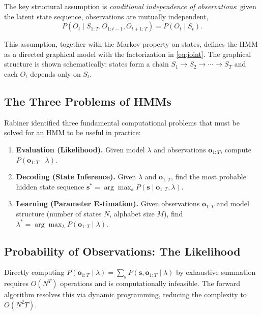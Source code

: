 \documentclass[conference]{IEEEtran}
\begin{document}
The key structural assumption is \emph{conditional independence of observations}: given the latent state sequence, observations are mutually independent,
\begin{equation}
P(O_t \mid S_{1:T}, O_{1:t-1}, O_{t+1:T}) = P(O_t \mid S_t).
\label{eq:obs_independence}
\end{equation}

This assumption, together with the Markov property on states, defines the HMM as a directed graphical model with the factorization in \eqref{eq:joint}. The graphical structure is shown schematically: states form a chain $S_1 \to S_2 \to \cdots \to S_T$ and each $O_t$ depends only on $S_t$.

\subsection{The Three Problems of HMMs}

Rabiner \cite{rabiner1989tutorial} identified three fundamental computational problems that must be solved for an HMM to be useful in practice:

\begin{enumerate}
  \item \textbf{Evaluation (Likelihood).} Given model $\lambda$ and observations $\mathbf{o}_{1:T}$, compute $P(\mathbf{o}_{1:T} \mid \lambda)$.
  \item \textbf{Decoding (State Inference).} Given $\lambda$ and $\mathbf{o}_{1:T}$, find the most probable hidden state sequence $\mathbf{s}^* = \arg\max_{\mathbf{s}} P(\mathbf{s} \mid \mathbf{o}_{1:T}, \lambda)$.
  \item \textbf{Learning (Parameter Estimation).} Given observations $\mathbf{o}_{1:T}$ and model structure (number of states $N$, alphabet size $M$), find $\lambda^* = \arg\max_{\lambda} P(\mathbf{o}_{1:T} \mid \lambda)$.
\end{enumerate}

\subsection{Probability of Observations: The Likelihood}

Directly computing $P(\mathbf{o}_{1:T} \mid \lambda) = \sum_{\mathbf{s}} P(\mathbf{s}, \mathbf{o}_{1:T} \mid \lambda)$ by exhaustive summation requires $O(N^T)$ operations and is computationally infeasible. The forward algorithm resolves this via dynamic programming, reducing the complexity to $O(N^2 T)$.
\end{document}
